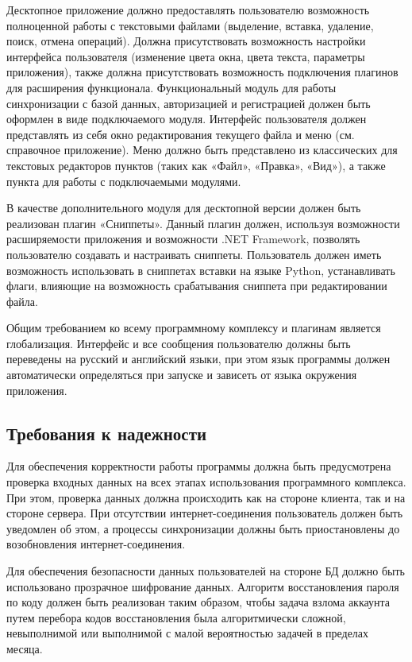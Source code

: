 ﻿\documentclass[techtask]{espd}
\begin{document}
Десктопное приложение должно предоставлять пользователю возможность полноценной работы с текстовыми файлами (выделение, вставка, удаление, поиск, отмена операций). Должна присутствовать возможность настройки интерфейса пользователя (изменение цвета окна, цвета текста, параметры приложения), также должна присутствовать возможность подключения плагинов для расширения функционала. Функциональный модуль для работы синхронизации с базой данных, авторизацией и регистрацией должен быть оформлен в виде подключаемого модуля. Интерфейс пользователя должен представлять из себя окно редактирования текущего файла и меню (см. справочное приложение). Меню должно быть представлено из классических для текстовых редакторов пунктов (таких как «Файл», «Правка», «Вид»), а также пункта для работы с подключаемыми модулями.

В качестве дополнительного модуля для десктопной версии должен быть реализован плагин «Сниппеты». Данный плагин должен, используя возможности расширяемости приложения и возможности .NET Framework, позволять пользователю создавать и настраивать сниппеты. Пользователь должен иметь возможность использовать в сниппетах вставки на языке Python, устанавливать флаги, влияющие на возможность срабатывания сниппета при редактировании файла.

Общим требованием ко всему программному комплексу и плагинам является глобализация. Интерфейс и все сообщения пользователю должны быть переведены на русский и английский языки, при этом язык программы должен автоматически определяться при запуске и зависеть от языка окружения приложения.

\subsection{Требования к надежности}
Для обеспечения корректности работы программы должна быть предусмотрена проверка входных данных на всех этапах использования программного комплекса. При этом, проверка данных должна происходить как на стороне клиента, так и на стороне сервера. При отсутствии интернет-соединения пользователь должен быть уведомлен об этом, а процессы синхронизации должны быть приостановлены до возобновления интернет-соединения.

Для обеспечения безопасности данных пользователей на стороне БД должно быть использовано прозрачное шифрование данных. Алгоритм восстановления пароля по коду должен быть реализован таким образом, чтобы задача взлома аккаунта путем перебора кодов восстановления была алгоритмически сложной, невыполнимой или выполнимой с малой вероятностью задачей в пределах месяца.
\end{document}

